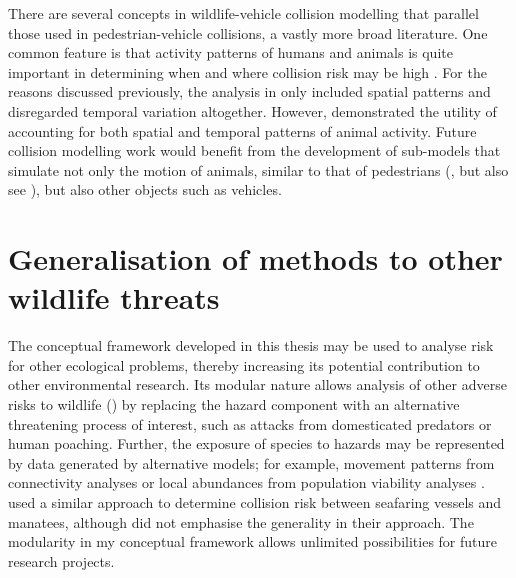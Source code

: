 There are several concepts in wildlife-vehicle collision modelling that parallel those used in pedestrian-vehicle collisions, a vastly more broad literature. One common feature is that activity patterns of humans and animals is quite important in determining when and where collision risk may be high \citep{mira11,lao11}. For the reasons discussed previously, the analysis in  only included spatial patterns and disregarded temporal variation altogether. However,  demonstrated the utility of accounting for both spatial and temporal patterns of animal activity. Future collision modelling work would benefit from the development of sub-models that simulate not only the motion of animals, similar to that of pedestrians (\cite{lohn10}, but also see \cite{jaar07}), but also other objects such as vehicles.

\section{Generalisation of methods to other wildlife threats}

The conceptual framework developed in this thesis may be used to analyse risk for other ecological problems, thereby increasing its potential contribution to other environmental research. Its modular nature allows analysis of other adverse risks to wildlife () by replacing the hazard component with an alternative threatening process of interest, such as attacks from domesticated predators or human poaching. Further, the exposure of species to hazards may be represented by data generated by alternative models; for example, movement patterns from connectivity analyses \citep{mcra08} or local abundances from population viability analyses \citep{beis02}. \cite{baud13} used a similar approach to determine collision risk between seafaring vessels and manatees, although did not emphasise the generality in their approach. The modularity in my conceptual framework allows unlimited possibilities for future research projects.

